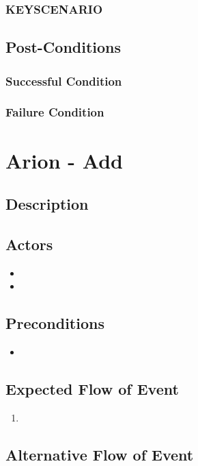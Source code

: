 \documentclass{scrreprt}
\begin{document}
    \subsection{KEYSCENARIO}

\section{Post-Conditions}
    \subsection{Successful Condition}
    
    \subsection{Failure Condition}


\chapter{Arion - Add}

\section{Description}

\section{Actors}
\begin{itemize}
    \item 
    \item 
\end{itemize}

\section{Preconditions}
\begin{itemize}
    \item 
\end{itemize}

\section{Expected Flow of Event}
\begin{enumerate}[1.]
    \item 
\end{enumerate}

\section{Alternative Flow of Event}
\end{document}
